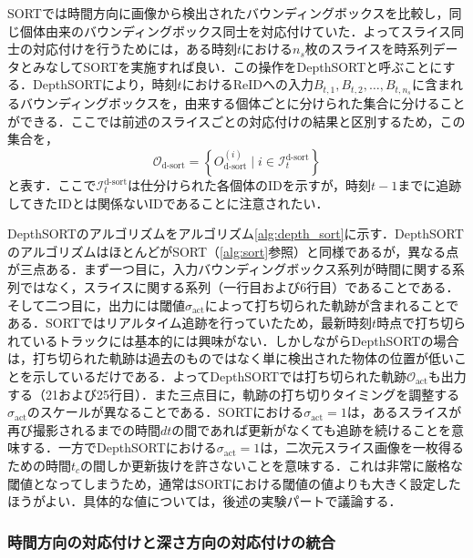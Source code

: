         SORTでは時間方向に画像から検出されたバウンディングボックスを比較し，同じ個体由来のバウンディングボックス同士を対応付けていた．よってスライス同士の対応付けを行うためには，ある時刻$t$における$n_s$枚のスライスを時系列データとみなしてSORTを実施すれば良い．この操作をDepthSORTと呼ぶことにする．DepthSORTにより，時刻$t$におけるReIDへの入力$B_{t, 1}, B_{t,2}, \dots, B_{t, n_s}$に含まれるバウンディングボックスを，由来する個体ごとに分けられた集合に分けることができる．ここでは前述のスライスごとの対応付けの結果と区別するため，この集合を，
        \begin{equation}
            \label{eq:dsort_identified_bboxes}
            \mathcal{O}_{\text{d-sort}} = \left\{O_{\text{d-sort}}^{(i)} \mid i \in \mathcal{I}_{t}^{\text{d-sort}}\right\}
        \end{equation}
        と表す．ここで$\mathcal{I}_t^{\text{d-sort}}$は仕分けられた各個体のIDを示すが，時刻$t-1$までに追跡してきたIDとは関係ないIDであることに注意されたい．

        DepthSORTのアルゴリズムをアルゴリズム\ref{alg:depth_sort}に示す．DepthSORTのアルゴリズムはほとんどがSORT（\ref{alg:sort}参照）と同様であるが，異なる点が三点ある．まず一つ目に，入力バウンディングボックス系列が時間に関する系列ではなく，スライスに関する系列（一行目および6行目）であることである．そして二つ目に，出力には閾値$\sigma_{\text{act}}$によって打ち切られた軌跡が含まれることである．SORTではリアルタイム追跡を行っていたため，最新時刻$t$時点で打ち切られているトラックには基本的には興味がない．しかしながらDepthSORTの場合は，打ち切られた軌跡は過去のものではなく単に検出された物体の位置が低いことを示しているだけである．よってDepthSORTでは打ち切られた軌跡$\mathcal{O}_{\text{act}}$も出力する（21および25行目）．また三点目に，軌跡の打ち切りタイミングを調整する$\sigma_{\text{act}}$のスケールが異なることである．SORTにおける$\sigma_{\text{act}} = 1$は，あるスライスが再び撮影されるまでの時間$dt$の間であれば更新がなくても追跡を続けることを意味する．一方でDepthSORTにおける$\sigma_{\text{act}} = 1$は，二次元スライス画像を一枚得るための時間$t_c$の間しか更新抜けを許さないことを意味する．これは非常に厳格な閾値となってしまうため，通常はSORTにおける閾値の値よりも大きく設定したほうがよい．具体的な値については，後述の実験パートで議論する．
        
        \subsubsection{時間方向の対応付けと深さ方向の対応付けの統合}

